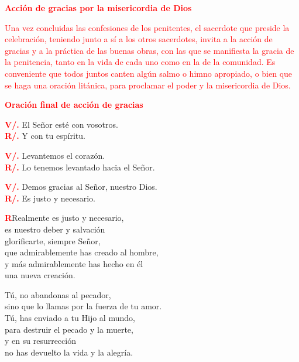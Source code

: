 \documentclass[12pt, letterpaper]{report}
\begin{document}
\Large {\bfseries \textcolor{red}{Acci\'on de gracias por la misericordia de Dios}}

\large {\textcolor{red}{Una vez concluidas las confesiones de los penitentes, el sacerdote que preside la celebraci\'on, teniendo junto a s\'i a los otros sacerdotes, invita a la acci\'on de gracias y a la pr\'actica de las buenas obras, con las que se manifiesta la gracia de la penitencia, tanto en la vida de cada uno como en la de la comunidad. Es conveniente que todos juntos canten alg\'un salmo o himno apropiado, o bien que se haga una oraci\'on lit\'anica, para proclamar el poder y la misericordia de Dios.}}

\newpage

\Large {\bfseries \textcolor{red}{Oraci\'on final de acci\'on de gracias}}

\noindent
\Large {\bfseries \textcolor{red}{V/.}} \hspace{0.5cm} El Se\~nor est\'e con vosotros.\\
\noindent
\Large {\bfseries \textcolor{red}{R/.}} \hspace{0.5cm} Y con tu esp\'iritu.

\noindent
\Large {\bfseries \textcolor{red}{V/.}} \hspace{0.5cm} Levantemos el coraz\'on.\\
\noindent
\Large {\bfseries \textcolor{red}{R/.}} \hspace{0.5cm} Lo tenemos levantado hacia el Se\~nor. 

\noindent
\Large {\bfseries \textcolor{red}{V/.}} \hspace{0.5cm} Demos gracias al Se\~nor, nuestro Dios.\\
\noindent
\Large {\bfseries \textcolor{red}{R/.}} \hspace{0.5cm} Es justo y necesario.

\lettrine[lines=2]{\bfseries \textcolor{red}{R}}{}\Large Realmente es justo y necesario,\\
es nuestro deber y salvaci\'on\\
glorificarte, siempre Se\~nor,\\
que admirablemente has creado al hombre,\\
y m\'as admirablemente has hecho en \'el\\
una nueva creaci\'on.

\noindent
\Large T\'u, no abandonas al pecador,\\
sino que lo llamas por la fuerza de tu amor.\\
T\'u, has enviado a tu Hijo al mundo,\\
para destruir el pecado y la muerte,\\
y en su resurrecci\'on\\
no has devuelto la vida y la alegr\'ia.
\end{document}
